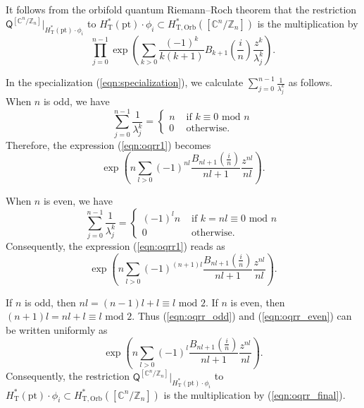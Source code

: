 \documentclass[12pt]{amsart}
\numberwithin{equation}{section}
\newcommand{\CnZn}{[\mathbb{C}^n/\mathbb{Z}_n]}
\begin{document}
It follows from the orbifold quantum Riemann--Roch theorem \cite{Tseng} that the restriction $\mathsf{Q}^{\CnZn}|_{H^*_{\mathrm{T}}(\text{pt})\cdot\phi_i}$ to $H^*_{\mathrm{T}}(\text{pt})\cdot\phi_i\subset H^*_{\mathrm{T,Orb}}(\CnZn)$ is the multiplication by
\begin{equation}\label{eqn:oqrr1}
\prod_{j=0}^{n-1}\exp\left(\sum_{k>0}\frac{(-1)^k}{k(k+1)}B_{k+1}\left(\frac{i}{n}\right)\frac{z^k}{\lambda_j^k} \right).
\end{equation}

In the specialization (\ref{eqn:specialization}), we calculate $\sum_{j=0}^{n-1}\frac{1}{\lambda_j^k}$ as follows. When $n$ is odd, we have 
\begin{equation}
\sum_{j=0}^{n-1}\frac{1}{\lambda_j^k}=
    \begin{cases}
    n & \text{ if } k\equiv 0 \text{ mod }n\\
    0 & \text{ otherwise}.
    \end{cases}
\end{equation}
Therefore, the expression (\ref{eqn:oqrr1}) becomes
\begin{equation}\label{eqn:oqrr_odd}
    \exp\left(n\sum_{l>0}(-1)^{nl}\frac{B_{nl+1}\left(\frac{i}{n}\right)}{nl+1}\frac{z^{nl}}{nl} \right).
\end{equation}

When $n$ is even, we have 
\begin{equation}
\sum_{j=0}^{n-1}\frac{1}{\lambda_j^k}=
    \begin{cases}
    (-1)^{l}n & \text{ if } k=nl\equiv 0 \text{ mod }n\\
    0 & \text{ otherwise}.
    \end{cases}
\end{equation}
Consequently, the expression (\ref{eqn:oqrr1}) reads as
\begin{equation}\label{eqn:oqrr_even}
    \exp\left(n\sum_{l>0}(-1)^{(n+1)l}\frac{B_{nl+1}\left(\frac{i}{n}\right)}{nl+1}\frac{z^{nl}}{nl} \right).
\end{equation}

If $n$ is odd, then $nl=(n-1)l+l\equiv l \text{ mod }2$. If $n$ is even, then $(n+1)l=nl+l\equiv l \text{ mod }2$. Thus (\ref{eqn:oqrr_odd}) and (\ref{eqn:oqrr_even}) can be written uniformly as
\begin{equation}\label{eqn:oqrr_final}
    \exp\left(n\sum_{l>0}(-1)^{l}\frac{B_{nl+1}\left(\frac{i}{n}\right)}{nl+1}\frac{z^{nl}}{nl} \right).
\end{equation}
Consequently, the restriction $\mathsf{Q}^{\CnZn}|_{H^*_{\mathrm{T}}(\text{pt})\cdot\phi_i}$ to $H^*_{\mathrm{T}}(\text{pt})\cdot\phi_i\subset H^*_{\mathrm{T,Orb}}(\CnZn)$ is the multiplication by (\ref{eqn:oqrr_final}).
\end{document}
